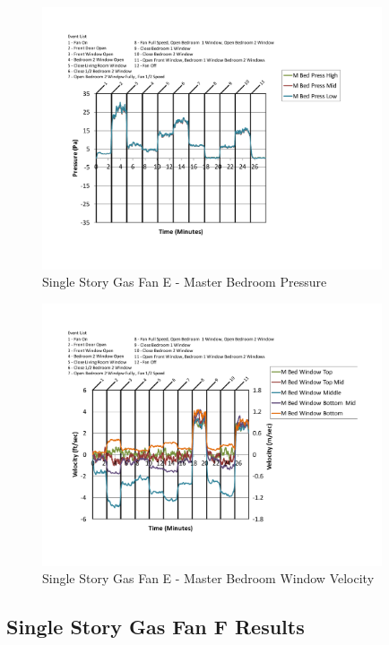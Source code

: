 \documentclass{article}
\begin{document}
\begin{appendices}
	\begin{figure}[H]
		\centering
		\includegraphics[height=3.05in,trim=0.67in 1.1in 0.67in 0.8in,clip=true]{0_Images/Results_Charts/ColdFlow/Single_Story/Gas/E/Master_Bedroom_Pressure.pdf}
		\caption{Single Story Gas Fan E - Master Bedroom Pressure}
	\end{figure}
 

	\begin{figure}[H]
		\centering
		\includegraphics[height=3.05in,trim=0.67in 1.1in 0.67in 0.8in,clip=true]{0_Images/Results_Charts/ColdFlow/Single_Story/Gas/E/Master_Bedroom_Window_Velocity.pdf}
		\caption{Single Story Gas Fan E - Master Bedroom Window Velocity}
	\end{figure}
 
	\clearpage

		\clearpage
\clearpage		\large
\subsection{Single Story Gas Fan F Results} \label{App:Single_StoryGasFanFResults} 


\end{appendices}
\end{document}
